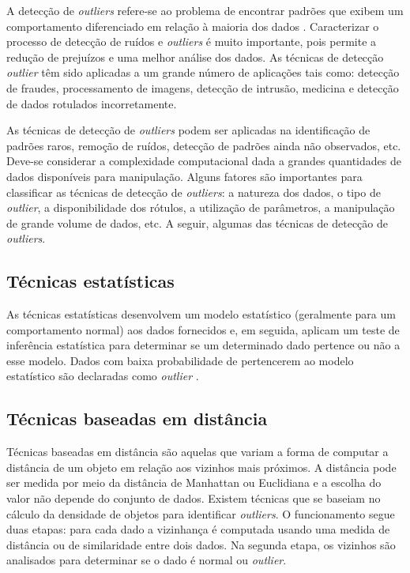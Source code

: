 A detecção de \textit{outliers} refere-se ao problema de encontrar padrões que exibem um comportamento diferenciado em relação à maioria dos dados \cite{chandola2009}. Caracterizar o processo de detecção de ruídos e \textit{outliers} é muito importante, pois permite a redução de prejuízos e uma melhor análise dos dados. As técnicas de detecção \textit{outlier} têm sido aplicadas a um grande número de aplicações tais como: detecção de fraudes, processamento de imagens, detecção de intrusão, medicina e detecção de dados rotulados incorretamente.

As técnicas de detecção de \textit{outliers} podem ser aplicadas na identificação de padrões raros, remoção de ruídos, detecção de padrões ainda não observados, etc. Deve-se considerar a complexidade computacional dada a grandes quantidades de dados disponíveis para manipulação. Alguns fatores são importantes para classificar as técnicas de detecção de \textit{outliers}: a natureza dos dados, o tipo de \textit{outlier}, a disponibilidade dos rótulos, a utilização de parâmetros, a manipulação de grande volume de dados, etc. A seguir, algumas das técnicas de detecção de \textit{outliers}.

\subsection{Técnicas estatísticas}
As técnicas estatísticas desenvolvem um modelo estatístico (geralmente para um comportamento normal) aos dados fornecidos e, em seguida, aplicam um teste de inferência estatística para determinar se um determinado dado pertence ou não a esse modelo. Dados com baixa probabilidade de pertencerem ao modelo estatístico são declaradas como \textit{outlier} \cite{chandola2009}.

\subsection{Técnicas baseadas em distância}
Técnicas baseadas em distância são aquelas que variam a forma de computar a distância de um objeto em relação aos vizinhos mais próximos. A distância pode ser medida por meio da distância de Manhattan ou Euclidiana e a escolha do valor não depende do conjunto de dados. Existem técnicas que se baseiam no cálculo da densidade de objetos para identificar \textit{outliers}. O funcionamento segue duas etapas: para cada dado a vizinhança é computada usando uma medida de distância ou de similaridade entre dois dados. Na segunda etapa, os vizinhos são analisados para determinar se o dado é normal ou \textit{outlier}.

